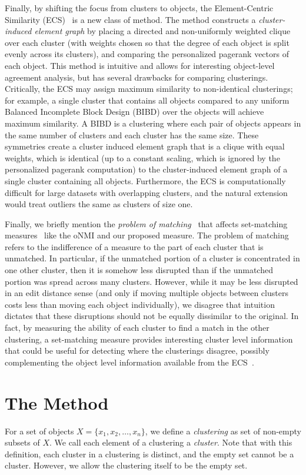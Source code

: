 \documentclass[11pt]{article}
\theoremstyle{remark}
\begin{document}
Finally, by shifting the focus from clusters to objects, the Element-Centric Similarity (ECS)~\cite{ecc} is a new class of method.
The method constructs a \textit{cluster-induced element graph} by placing a directed and non-uniformly weighted clique over each cluster (with weights chosen so that the degree of each object is split evenly across its clusters), and comparing the personalized pagerank vectors of each object.
This method is intuitive and allows for interesting object-level agreement analysis, but  has several drawbacks for comparing clusterings.
Critically, the ECS may assign maximum similarity to non-identical clusterings; for example, a single cluster that contains all objects compared to any uniform Balanced Incomplete Block Design (BIBD) over the objects will achieve maximum similarity.
A BIBD is a clustering where each pair of objects appears in the same number of clusters and each cluster has the same size.
These symmetries create a cluster induced element graph that is a clique with equal weights, which is identical (up to a constant scaling, which is ignored by the personalized pagerank computation) to the cluster-induced element graph of a single cluster containing all objects.
Furthermore, the ECS is computationally difficult for large datasets with overlapping clusters, and the natural extension would treat outliers the same as clusters of size one.

Finally, we briefly mention the \textit{problem of matching}~\cite{vi} that affects set-matching measures~\cite{setmatching} like the oNMI and our proposed measure.
The problem of matching refers to the indifference of a measure to the part of each cluster that is unmatched.
In particular, if the unmatched portion of a cluster is concentrated in one other cluster, then it is somehow less disrupted than if the unmatched portion was spread across many clusters.
However, while it may be less disrupted in an edit distance sense (and only if moving multiple objects between clusters costs less than moving each object individually), we disagree that intuition dictates that these disruptions should not be equally dissimilar to the original. 
In fact, by measuring the ability of each cluster to find a match in the other clustering, a set-matching measure provides interesting cluster level information that could be useful for detecting where the clusterings disagree, possibly complementing the object level information available from the ECS~\cite{ecc}.

\section{The Method}
For a set of objects $X = \{x_1, x_2, \ldots, x_n\}$, we define a \textit{clustering} as set of non-empty subsets of $X$.
We call each element of a clustering a \textit{cluster}.
Note that with this definition, each cluster in a clustering is distinct, and the empty set cannot be a cluster.
However, we allow the clustering itself to be the empty set.
\end{document}
